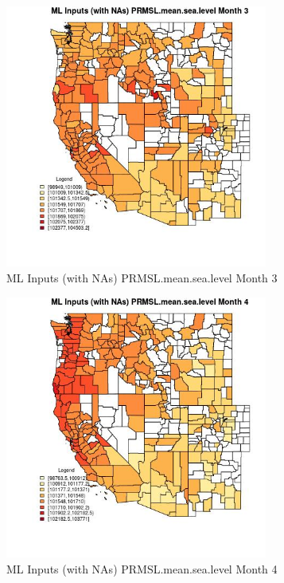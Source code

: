 \begin{figure} 
\centering  
\includegraphics[width=0.77\textwidth]{Code_Outputs/Report_ML_input_PM25_Step4_part_e_de_duplicated_aves_compiled_2019-05-21wNAs_CountyPRMSLmeansealevelmedianMonth3.jpg} 
\caption{\label{fig:Report_ML_input_PM25_Step4_part_e_de_duplicated_aves_compiled_2019-05-21wNAsCountyPRMSLmeansealevelmedianMonth3}ML Inputs (with NAs) PRMSL.mean.sea.level Month 3} 
\end{figure} 
 

\begin{figure} 
\centering  
\includegraphics[width=0.77\textwidth]{Code_Outputs/Report_ML_input_PM25_Step4_part_e_de_duplicated_aves_compiled_2019-05-21wNAs_CountyPRMSLmeansealevelmedianMonth4.jpg} 
\caption{\label{fig:Report_ML_input_PM25_Step4_part_e_de_duplicated_aves_compiled_2019-05-21wNAsCountyPRMSLmeansealevelmedianMonth4}ML Inputs (with NAs) PRMSL.mean.sea.level Month 4} 
\end{figure} 
 


